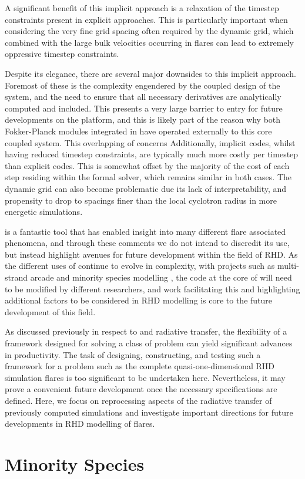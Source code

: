 A significant benefit of this implicit approach is a relaxation of the timestep constraints present in explicit approaches.
This is particularly important when considering the very fine grid spacing often required by the dynamic grid, which combined with the large bulk velocities occurring in flares can lead to extremely oppressive timestep constraints.

Despite its elegance, there are several major downsides to this implicit approach.
Foremost of these is the complexity engendered by the coupled design of the system, and the need to ensure that all necessary derivatives are analytically computed and included.
This presents a very large barrier to entry for future developments on the platform, and this is likely part of the reason why both Fokker-Planck modules integrated in \Radyn{} have operated externally to this core coupled system.
This overlapping of concerns
Additionally, implicit codes, whilst having reduced timestep constraints, are typically much more costly per timestep than explicit codes.
This is somewhat offset by the majority of the cost of each step residing within the formal solver, which remains similar in both cases.
The dynamic grid can also become problematic due its lack of interpretability, and propensity to drop to spacings finer than the local cyclotron radius in more energetic simulations.

\Radyn{} is a fantastic tool that has enabled insight into many different flare associated phenomena, and through these comments we do not intend to discredit its use, but instead highlight avenues for future development within the field of RHD.
As the different uses of \Radyn{} continue to evolve in complexity, with projects such as multi-strand arcade and minority species modelling \NeedRef{}, the code at the core of \Radyn{} will need to be modified by different researchers, and work facilitating this and highlighting additional factors to be considered in RHD modelling is core to the future development of this field.

As discussed previously in respect to \Lw{} and radiative transfer, the flexibility of a framework designed for solving a class of problem can yield significant advances in productivity.
The task of designing, constructing, and testing such a framework for a problem such as the complete quasi-one-dimensional RHD simulation flares is too significant to be undertaken here.
Nevertheless, it may prove a convenient future development once the necessary specifications are defined.
Here, we focus on reprocessing aspects of the radiative transfer of previously computed \Radyn{} simulations and investigate important directions for future developments in RHD modelling of flares.

\section{Minority Species}